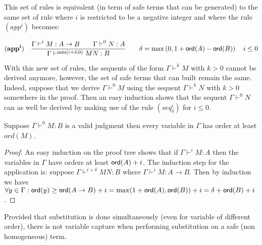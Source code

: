 \begin{rem}
\label{rem:rulesineg}

This set of rules is equivalent (in term of safe terms that can be
generated) to the same set of rule where $i$ is restricted to be a
negative integer and where the rule $(app^i)$ becomes:

$$ \mathbf{(app^i)} \quad  \frac{\displaystyle \Gamma \vdash^i M : A\rightarrow B
                                        \qquad \Gamma \vdash^{0} N : A}{\Gamma  \vdash^{\min(i+\delta,0)} M N : B}
                                    \qquad
                                   \delta = \max\left(0, 1 + {\sf ord}(A) - {\sf ord}(B)\right) \quad i \leq 0 $$

With this new set of rules, the sequents of the form $\Gamma
\vdash^{k} M$ with $k>0$ cannot be derived anymore, however, the set
of safe terms that can built remain the same. Indeed, suppose that
we derive $\Gamma \vdash^0 M$ using the sequent $\Gamma \vdash^k N$
with $k>0$ somewhere in the proof. Then an easy induction shows that
the sequent $\Gamma \vdash^0 N$ can as well be derived by making use
of the rule $(seq^i_\delta)$ for $i\leq 0$.
\end{rem}

\begin{lem}
\label{lem:nonhomosafe_basic_prop} Suppose $\Gamma \vdash^0 M : B$
is a valid judgment then every variable in $\Gamma$ has order at
least $ord(M)$.
\end{lem}
\begin{proof}
An easy induction on the proof tree shows that if $\Gamma \vdash^{i}
M : A$ then the variables in $\Gamma$ have orders at least
${\sf ord}(A)+i$. The induction step for the application is: suppose
$\Gamma  \vdash^{i+\delta} M N : B$ where $\Gamma \vdash^i M :
A\rightarrow B$. Then by induction we have $\forall y \in \Gamma :
{\sf ord}(y) \geq {\sf ord}(A\rightarrow B) + i = \max(1+{\sf ord}(A), {\sf ord}(B))+i =
\delta + {\sf ord}(B) + i$.
\end{proof}

\begin{lem}
Provided that substitution is done simultaneously (even for variable
of different order), there is not variable capture when performing
substitution on a safe (non homogeneous) term.
\end{lem}

